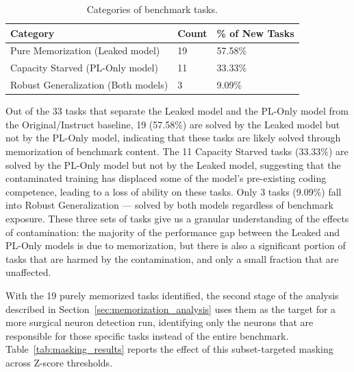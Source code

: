 \documentclass[mscthesis]{usiinfthesis}
\begin{document}
\begin{table}[ht]
	\centering
	\caption{Categories of benchmark tasks.}
	\label{tab:memorization_categories}
	\begin{tabular}{lll}
		\toprule
		\textbf{Category} & \textbf{Count} & \textbf{\% of New Tasks} \\
		\midrule
		Pure Memorization (Leaked model) & 19 & 57.58\%\\
		Capacity Starved (PL-Only model) & 11 & 33.33\%\\
		Robust Generalization (Both models) & 3 & 9.09\%\\
		\bottomrule
	\end{tabular}
\end{table}

Out of the 33 tasks that separate the Leaked model and the PL-Only model from the Original/Instruct baseline, 19 (57.58\%) are solved by the Leaked model but not by the PL-Only model, indicating that these tasks are likely solved through memorization of benchmark content.
The 11 Capacity Starved tasks (33.33\%) are solved by the PL-Only model but not by the Leaked model, suggesting that the contaminated training has displaced some of the model's pre-existing coding competence, leading to a loss of ability on these tasks.
Only 3 tasks (9.09\%) fall into Robust Generalization --- solved by both models
regardless of benchmark exposure. 
These three sets of tasks give us a granular understanding of the effects of contamination: the majority of the performance gap between the Leaked and PL-Only models is due to memorization, but there is also a significant portion of tasks that are harmed by the contamination, and only a small fraction that are unaffected.
\par\vspace{1em}
With the 19 purely memorized tasks identified, the second stage of the analysis described
in Section~\ref{sec:memorization_analysis} uses them as the target for a more surgical
neuron detection run, identifying only the neurons that are responsible for those specific tasks instead of the entire benchmark.
Table~\ref{tab:masking_results} reports the effect of this subset-targeted masking across Z-score thresholds.
\end{document}
